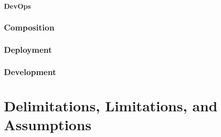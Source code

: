 \paragraph{DevOps}

\subsubsection{\ms{} Composition}

\subsubsection{\ms{} Deployment}

\subsubsection{\ms{} Development}

\section{Delimitations, Limitations, and Assumptions}





















